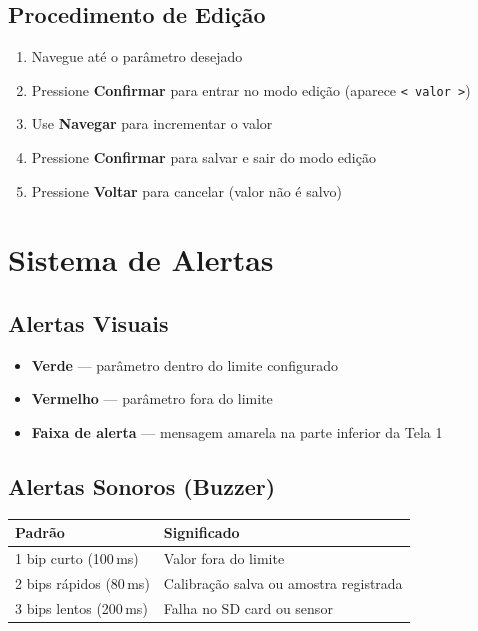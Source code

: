 \documentclass[12pt,a4paper]{article}
\begin{document}
\subsection{Procedimento de Edição}

\begin{enumerate}[nosep]
  \item Navegue até o parâmetro desejado
  \item Pressione \textbf{Confirmar} para entrar no modo edição (aparece \texttt{< valor >})
  \item Use \textbf{Navegar} para incrementar o valor
  \item Pressione \textbf{Confirmar} para salvar e sair do modo edição
  \item Pressione \textbf{Voltar} para cancelar (valor não é salvo)
\end{enumerate}

\section{Sistema de Alertas}

\subsection{Alertas Visuais}

\begin{itemize}[nosep]
  \item \textbf{Verde} --- parâmetro dentro do limite configurado
  \item \textbf{Vermelho} --- parâmetro fora do limite
  \item \textbf{Faixa de alerta} --- mensagem amarela na parte inferior da Tela 1
\end{itemize}

\subsection{Alertas Sonoros (Buzzer)}

\begin{tabularx}{\textwidth}{l X}
\toprule
\textbf{Padrão} & \textbf{Significado} \\
\midrule
1 bip curto (100\,ms) & Valor fora do limite \\
2 bips rápidos (80\,ms) & Calibração salva ou amostra registrada \\
3 bips lentos (200\,ms) & Falha no SD card ou sensor \\
\bottomrule
\end{tabularx}
\end{document}
